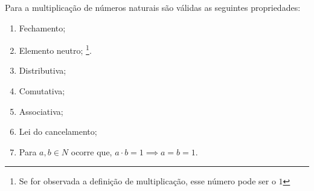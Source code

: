 \documentclass[../main.tex]{subfiles}
\begin{document}
\begin{prop}{Para a multiplicação de números naturais são válidas as seguintes propriedades:}
    \begin{enumerate}[label=(\roman*)]
        \item Fechamento;
        \item Elemento neutro; \footnote{Se for observada a definição de multiplicação, esse número pode ser o $1$}.
        \item Distributiva;
        \item Comutativa;
        \item Associativa;
        \item Lei do cancelamento;
        \item Para $a,b \in N$ ocorre que, $a \cdot b = 1 \implies a = b = 1$.
    \end{enumerate}
\end{prop}
\end{document}
